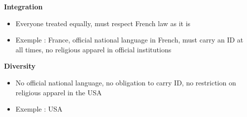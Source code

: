 \documentclass[11pt,a4paper,oneside,french,svgnames]{report}
\begin{document}
\begin{center}
\begin{minipage}[t]{.49\textwidth}
\centering\textbf{Integration}\\
  \begin{itemize}
    \item Everyone treated equally, must respect French law as it is
    \item Exemple : France, official national language in French, must carry an ID at all times, no religious apparel in official institutions
  \end{itemize}
\end{minipage}
\begin{minipage}[t]{.49\textwidth}
\centering\textbf{Diversity}\\
  \begin{itemize}
    \item No official national language, no obligation to carry ID, no restriction on religious apparel in the USA
    \item Exemple : USA
  \end{itemize}
\end{minipage}

\end{center}
\end{document}
